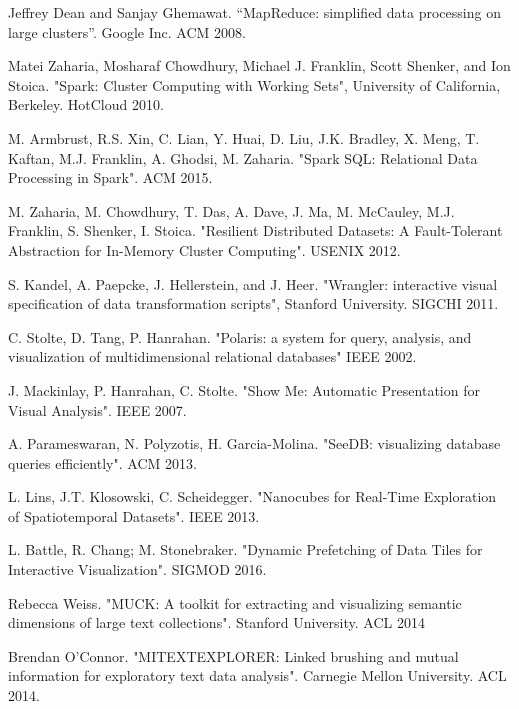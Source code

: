 \documentclass[10pt, a4paper, twocolumn]{article} %
\begin{document}
\begin{thebibliography}{99} %

Jeffrey Dean and Sanjay Ghemawat. “MapReduce: simplified data processing on large clusters”. Google Inc. ACM 2008.

Matei Zaharia, Mosharaf Chowdhury, Michael J. Franklin, Scott Shenker, and Ion Stoica. "Spark: Cluster Computing with Working Sets", University of California, Berkeley. HotCloud 2010.

M. Armbrust, R.S. Xin, C. Lian, Y. Huai, D. Liu, J.K. Bradley, X. Meng, T. Kaftan, M.J. Franklin, A. Ghodsi, M. Zaharia.
"Spark SQL: Relational Data Processing in Spark".
ACM 2015.

M. Zaharia, M. Chowdhury, T. Das, A. Dave, J. Ma, M. McCauley, M.J. Franklin, S. Shenker, I. Stoica. "Resilient Distributed Datasets: A Fault-Tolerant Abstraction for In-Memory Cluster Computing". USENIX 2012.

S. Kandel, A. Paepcke, J. Hellerstein, and J. Heer. "Wrangler: interactive visual specification of data transformation scripts", Stanford University. SIGCHI 2011.

 C. Stolte, D. Tang, P. Hanrahan. "Polaris: a system for query, analysis, and visualization of multidimensional relational databases"
IEEE 2002.

 J. Mackinlay, P. Hanrahan, C. Stolte. "Show Me: Automatic Presentation for Visual Analysis". IEEE 2007.

 A. Parameswaran, N. Polyzotis, H. Garcia-Molina. "SeeDB: visualizing database queries efficiently". ACM 2013.

 L. Lins, J.T. Klosowski, C. Scheidegger. "Nanocubes for Real-Time Exploration of Spatiotemporal Datasets". IEEE 2013.

 L. Battle, R. Chang; M. Stonebraker. "Dynamic Prefetching of Data Tiles for Interactive Visualization". SIGMOD 2016.

Rebecca Weiss. "MUCK: A toolkit for extracting and visualizing semantic dimensions of large text collections". Stanford University. ACL 2014

Brendan O’Connor. "MITEXTEXPLORER: Linked brushing and mutual information for exploratory text data analysis". Carnegie Mellon University. ACL 2014.


\end{thebibliography}
\end{document}
